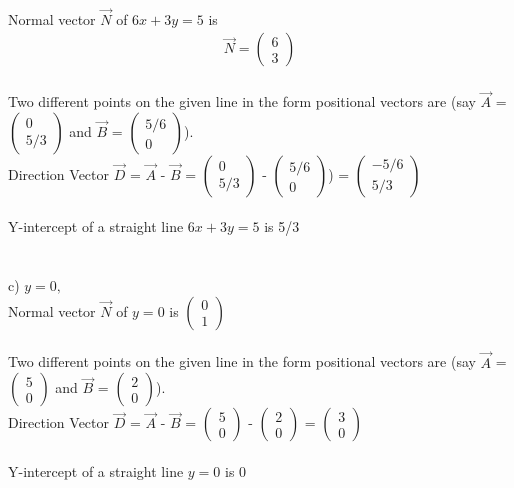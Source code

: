 \documentclass[journal,12pt,twocolumn]{IEEEtran}
\newcommand{\myvec}[1]{\ensuremath{\begin{pmatrix}#1\end{pmatrix}}}
\begin{document}
\\
Normal vector $\vec{N}$ of $ 6x  + 3y = 5 $ is   \begin{align}
	\vec{N} = \myvec{ 6 \\ 3 }
\end{align}
\\
	Two different points on the given line in the form positional vectors are (say $\vec{A}$ = \myvec{ 0 \\ 5/3 } and $\vec{B}$ = \myvec{ 5/6 \\ 0 }).\\
Direction Vector $\vec{D}$ = $\vec{A}$ - $\vec{B}$ = \myvec{ 0 \\ 5/3 } - \myvec{ 5/6 \\ 0 }) = \myvec{ -5/6 \\ 5/3 }
\\
\\
Y-intercept of a straight line $ 6x  + 3y =  5 $ is 5/3
\\
\\
\\
c) $ y =  0,$
\\
Normal vector $\vec{N}$ of $ y = 0 $ is   \myvec{ 0 \\ 1 }
\\
\\
	Two different points on the given line in the form positional vectors are (say $\vec{A}$ = \myvec{ 5 \\ 0 } and $\vec{B}$ = \myvec{ 2 \\ 0 }).\\
Direction Vector $\vec{D}$ = $\vec{A}$ - $\vec{B}$ = \myvec{ 5 \\ 0 } - \myvec{ 2 \\ 0 } = \myvec{ 3 \\ 0 }
\\
\\
Y-intercept of a straight line $ y =  0 $ is 0
\end{document}

